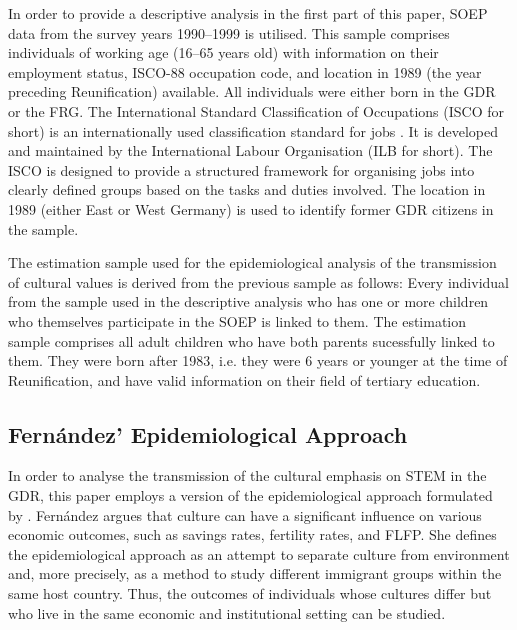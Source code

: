 \documentclass[a4paper, oneside, hyperfootnotes = false]{article}
\begin{document}
{%
In order to provide a descriptive analysis in the first part of this paper, SOEP data from the survey years 1990--1999 is utilised.
This sample comprises individuals of working age (16--65 years old) with information on their employment status, ISCO-88 occupation code, and location in 1989 (the year preceding Reunification) available.
All individuals were either born in the GDR or the FRG.
The International Standard Classification of Occupations (ISCO for short) is an internationally used classification standard for jobs \citep{Elias1997}.
It is developed and maintained by the International Labour Organisation (ILB for short).
The ISCO is designed to provide a structured framework for organising jobs into clearly defined groups based on the tasks and duties involved.
The location in 1989 (either East or West Germany) is used to identify former GDR citizens in the sample.

The estimation sample used for the epidemiological analysis of the transmission of cultural values is derived from the previous sample as follows:
Every individual from the sample used in the descriptive analysis who has one or more children who themselves participate in the SOEP is linked to them.
The estimation sample comprises all adult children who have both parents sucessfully linked to them.
They were born after 1983, i.e. they were 6 years or younger at the time of Reunification, and have valid information on their field of tertiary education.

\subsection{Fernández' Epidemiological Approach}
\label{epid}

In order to analyse the transmission of the cultural emphasis on STEM in the GDR, this paper employs a version of the epidemiological approach formulated by \cite{Fernandez2011}.
Fernández argues that culture can have a significant influence on various economic outcomes, such as savings rates, fertility rates, and FLFP.
She defines the epidemiological approach as an attempt to separate culture from environment and, more precisely, as a method to study different immigrant groups within the same host country. %
Thus, the outcomes of individuals whose cultures differ but who live in the same economic and institutional setting can be studied.

}
\end{document}
